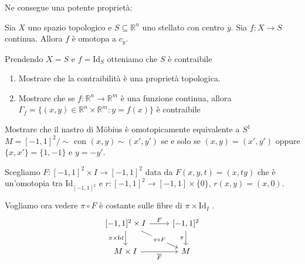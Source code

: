 Ne consegue una potente proprietà:
\begin{lemma}
    Sia \(X\) uno spazio topologico e \(S \subseteq \mathbb{R}^{n} \) uno
    stellato con centro \(\overline{y}\). Sia \(f : X \to S\) continua. Allora
    \(f\) è omotopa a \(c_{\overline{y}} \).
\end{lemma}
\begin{corollary}
    Prendendo \(X = S\) e \(f = \mathrm{Id}_S\) otteniamo che \(S\) è
    contraibile
\end{corollary}

\begin{eser}[\(\star\)]
\begin{enumerate}[label = \arabic*.]
    \item Mostrare che la contraibilità è una proprietà topologica.
    \item Mostrare che se \(f: \mathbb{R}^{n} \to \mathbb{R}^{m}\) è una funzione
    continua, allora \(\Gamma_f = \{{(x, y)} \in \mathbb{R}^{n}\times
    \mathbb{R}^{m}: y = f{(x)}\}  \) è contraibile
\end{enumerate}
\end{eser}

\begin{eser}
    Mostrare che il nastro di Möbius è omotopicamente equivalente a \(S^{1}\) 
    \tcblower
    \(M = [-1,1]^2 / \sim \) con \({(x,y)}\sim {(x', y')} \) se e solo se
    \({(x,y)} = {(x',y')}\) oppure \(\{x, x'\} = \{1, -1\}  \) e \(y = -y'\).

    Scegliamo \(F : [-1,1]^2 \times  I \to [-1,1]^2\) data da \(F{(x, y, t)} =
    {(x, ty)}\) che è un'omotopia tra \(\mathrm{Id}_{[-1,1]^2} \) e \(r : [-1,
    1]^2 \to [-1, 1] \times \{0\} \), \(r{(x,y)} = {(x, 0)}\). 

    Vogliamo ora vedere \(\pi \circ F\) è costante sulle fibre di \(\pi \times
    \mathrm{Id}_I\) .%
\[\begin{tikzcd}
	{[-1,1]^2 \times I} & {[-1,1]^2} \\
	{M\times I} & M
	\arrow["F", from=1-1, to=1-2]
	\arrow["{\pi \times \mathrm{Id}}"', from=1-1, to=2-1]
	\arrow["{\pi \circ F}"{description}, from=1-1, to=2-2]
	\arrow["\pi"', from=1-2, to=2-2]
	\arrow["{\overline{F}}"', from=2-1, to=2-2]
\end{tikzcd}\]
\end{eser}

